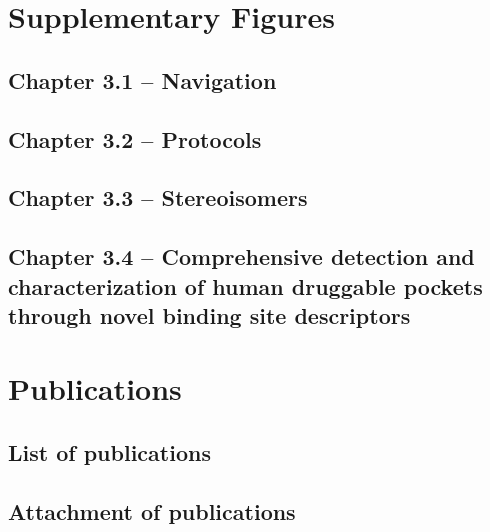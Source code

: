 \titleformat{\section}[block]
  {\normalfont\LARGE\bfseries}{\thesection}{1em}{}


\chapter{Supplementary Figures}
\newpage

\section{Chapter 3.1 -- Navigation}
\section{Chapter 3.2 -- Protocols}
\section{Chapter 3.3 -- Stereoisomers}


\section{Chapter 3.4 -- Comprehensive detection and characterization of human druggable pockets through novel binding site descriptors}




\chapter{Publications}
\newpage
\section{List of publications}
\section{Attachment of publications}

